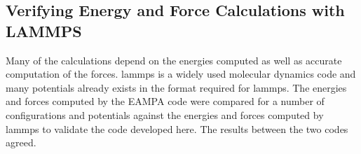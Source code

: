 \subsection{Verifying Energy and Force Calculations with LAMMPS}

Many of the calculations depend on the energies computed as well as accurate computation of the forces.  \acrshort{lammps} is a widely used molecular dynamics code and many potentials already exists in the format required for \acrshort{lammps}.  The energies and forces computed by the EAMPA code were compared for a number of configurations and potentials against the energies and forces computed by \acrshort{lammps} to validate the code developed here.  The results between the two codes agreed.



